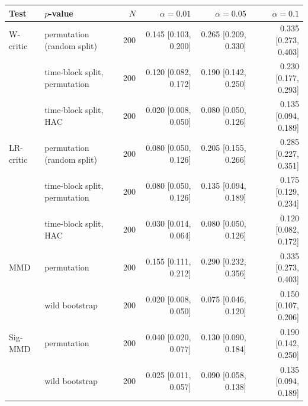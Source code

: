 \begin{tabular}{llrrrr}
\toprule
Test & $p$-value & $N$ & $\alpha=0.01$ & $\alpha=0.05$ & $\alpha=0.1$ \\
\midrule
W-critic & permutation (random split) & 200 & 0.145 [0.103, 0.200] & 0.265 [0.209, 0.330] & 0.335 [0.273, 0.403] \\
 & time-block split, permutation & 200 & 0.120 [0.082, 0.172] & 0.190 [0.142, 0.250] & 0.230 [0.177, 0.293] \\
 & time-block split, HAC & 200 & 0.020 [0.008, 0.050] & 0.080 [0.050, 0.126] & 0.135 [0.094, 0.189] \\
LR-critic & permutation (random split) & 200 & 0.080 [0.050, 0.126] & 0.205 [0.155, 0.266] & 0.285 [0.227, 0.351] \\
 & time-block split, permutation & 200 & 0.080 [0.050, 0.126] & 0.135 [0.094, 0.189] & 0.175 [0.129, 0.234] \\
 & time-block split, HAC & 200 & 0.030 [0.014, 0.064] & 0.080 [0.050, 0.126] & 0.120 [0.082, 0.172] \\
MMD & permutation & 200 & 0.155 [0.111, 0.212] & 0.290 [0.232, 0.356] & 0.335 [0.273, 0.403] \\
 & wild bootstrap & 200 & 0.020 [0.008, 0.050] & 0.075 [0.046, 0.120] & 0.150 [0.107, 0.206] \\
Sig-MMD & permutation & 200 & 0.040 [0.020, 0.077] & 0.130 [0.090, 0.184] & 0.190 [0.142, 0.250] \\
 & wild bootstrap & 200 & 0.025 [0.011, 0.057] & 0.090 [0.058, 0.138] & 0.135 [0.094, 0.189] \\
\bottomrule
\end{tabular}
